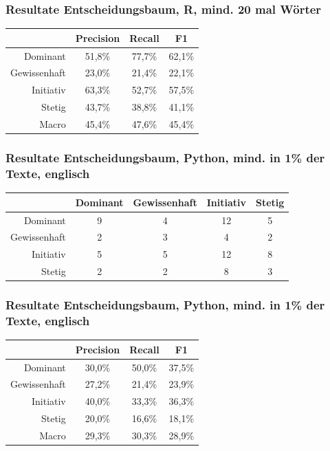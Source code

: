 \documentclass{beamer}
\begin{document}
\begin{frame}
\frametitle{Resultate Entscheidungsbaum, R, mind. 20 mal Wörter}
\begin{center}
\begin{tabular}{r|c|c|c|}
 &  Precision  & Recall & F1 \\
\hline
Dominant     & 51,8\% & 77,7\% & 62,1\% \\
Gewissenhaft & 23,0\% & 21,4\% & 22,1\% \\
Initiativ    & 63,3\% & 52,7\% & 57,5\% \\
Stetig       & 43,7\% & 38,8\% & 41,1\% \\
\hline
Macro        & 45,4\% & 47,6\% & 45,4\%
\end{tabular}
\end{center}
\end{frame}
\begin{frame}
\frametitle{Resultate Entscheidungsbaum, Python, mind. in 1\% der Texte, englisch}
\begin{center}
\begin{tabular}{r|c|c|c|c|}
 &  Dominant  & Gewissenhaft & Initiativ & Stetig\\
\hline
Dominant &     9 & 4 & 12 & 5 \\
Gewissenhaft & 2 & 3 & 4 & 2\\
Initiativ &    5 & 5 & 12 & 8\\
Stetig &       2 & 2 & 8 & 3
\end{tabular}
\end{center}
\end{frame}
\begin{frame}
\frametitle{Resultate Entscheidungsbaum, Python, mind. in 1\% der Texte, englisch}
\begin{center}
\begin{tabular}{r|c|c|c|}
 &  Precision  & Recall & F1 \\
\hline
Dominant     & 30,0\% & 50,0\% & 37,5\% \\
Gewissenhaft & 27,2\% & 21,4\% & 23,9\% \\
Initiativ    & 40,0\% & 33,3\% & 36,3\% \\
Stetig       & 20,0\% & 16,6\% & 18,1\% \\
\hline
Macro        & 29,3\% & 30,3\% & 28,9\%
\end{tabular}
\end{center}
\end{frame}
\end{document}
